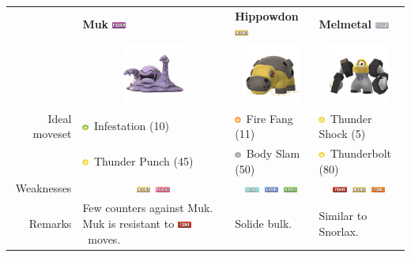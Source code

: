 \documentclass[12pt]{beamer}
\newcommand{\fightingfull}{\includegraphics[height=0.2cm]{../../images/type/full/Fighting.png}}
\newcommand{\firefull}{\includegraphics[height=0.2cm]{../../images/type/full/Fire.png}}
\newcommand{\grassfull}{\includegraphics[height=0.2cm]{../../images/type/full/Grass.png}}
\newcommand{\groundfull}{\includegraphics[height=0.2cm]{../../images/type/full/Ground.png}}
\newcommand{\icefull}{\includegraphics[height=0.2cm]{../../images/type/full/Ice.png}}
\newcommand{\psychicfull}{\includegraphics[height=0.2cm]{../../images/type/full/Psychic.png}}
\newcommand{\waterfull}{\includegraphics[height=0.2cm]{../../images/type/full/Water.png}}
\newcommand{\poisonfull}{\includegraphics[height=0.2cm]{../../images/type/full/Poison.png}}
\newcommand{\steelfull}{\includegraphics[height=0.2cm]{../../images/type/full/Steel.png}}
\newcommand{\electricsimp}{\includegraphics[height=0.2cm]{../../images/type/simplified/electric.png}}
\newcommand{\firesimp}{\includegraphics[height=0.2cm]{../../images/type/simplified/fire.png}}
\newcommand{\bugsimp}{\includegraphics[height=0.2cm]{../../images/type/simplified/bug.png}}
\newcommand{\normalsimp}{\includegraphics[height=0.2cm]{../../images/type/simplified/normal.png}}
\begin{document}
\begin{frame}
\begin{block}{}
\begin{footnotesize}
\begin{tabular}{rp{3.2cm}p{3.2cm}p{3.2cm}}
& \textbf{Muk} \hfill \poisonfull & \textbf{Hippowdon} \hfill \groundfull &  \textbf{Melmetal} \hfill \steelfull  \\ 
&\multicolumn{1}{c}{\includegraphics[width=2cm]{../../images/pokemon/Muk}} &
\multicolumn{1}{c}{\includegraphics[width=2cm]{../../images/pokemon/Hippowdon}} &
\multicolumn{1}{c}{\includegraphics[width=2cm]{../../images/pokemon/Melmetal}} \\ \hline
Ideal moveset & \bugsimp~Infestation (10) & \firesimp~Fire Fang (11)&  \electricsimp~Thunder Shock (5)  \\
& \electricsimp~Thunder Punch (45) & \normalsimp~Body Slam (50)&  \electricsimp~Thunderbolt (80)  \\ \hline
Weaknesses &  \multicolumn{1}{c}{\groundfull~\psychicfull} & \multicolumn{1}{c}{\icefull~\waterfull~\grassfull} & \multicolumn{1}{c}{\fightingfull~\groundfull~\firefull} \\ \hline
Remarks & Few counters against Muk. Muk is resistant to \fightingfull~moves. & Solide bulk. & Similar to Snorlax.  \\
\end{tabular}





\end{footnotesize}
\end{block}
\end{frame}
\end{document}
